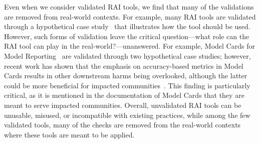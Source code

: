 Even when we consider validated RAI tools, we find that many of the validations are removed from real-world contexts.
For example, many RAI tools are validated through a hypothetical case study~\citep[e.g.][]{dAlessandro2017, Moon2019, Vidgen2019} that illustrates how the tool should be used.
However, such forms of validation leave the critical question---what role can the RAI tool can play in the real-world?---unanswered. 
For example, Model Cards for Model Reporting~\cite{Mitchell2019} are validated through two hypothetical case studies; however, recent work has shown that the emphasis on accuracy-based metrics in Model Cards results in other downstream harms being overlooked, although the latter could be more beneficial for impacted communities~\cite{kawakami2024responsible}.
This finding is particularly critical, as it is mentioned in the documentation of Model Cards that they are meant to serve impacted communities. 
Overall, unvalidated RAI tools can be unusable, misused, or incompatible with existing practices, while among the few validated tools, many of the checks are removed from the real-world contexts where these tools are meant to be applied.



